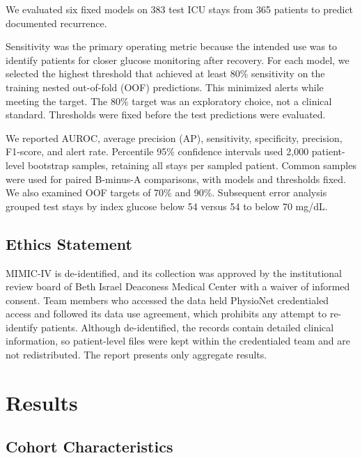\documentclass[twocolumn, 8pt]{article}
\begin{document}
We evaluated six fixed models on 383 test ICU stays from 365 patients to predict documented recurrence.

Sensitivity was the primary operating metric because the intended use was to identify patients for closer glucose monitoring after recovery. For each model, we selected the highest threshold that achieved at least 80\% sensitivity on the training nested out-of-fold (OOF) predictions. This minimized alerts while meeting the target. The 80\% target was an exploratory choice, not a clinical standard. Thresholds were fixed before the test predictions were evaluated.

We reported AUROC, average precision (AP), sensitivity, specificity, precision, F1-score, and alert rate. Percentile 95\% confidence intervals used 2,000 patient-level bootstrap samples, retaining all stays per sampled patient. Common samples were used for paired B-minus-A comparisons, with models and thresholds fixed. We also examined OOF targets of 70\% and 90\%. Subsequent error analysis grouped test stays by index glucose below 54 versus 54 to below 70 mg/dL.

\subsection*{Ethics Statement}

MIMIC-IV is de-identified, and its collection was approved by the institutional review board of Beth Israel Deaconess Medical Center with a waiver of informed consent.\cite{johnson2023mimiciv} Team members who accessed the data held PhysioNet credentialed access and followed its data use agreement, which prohibits any attempt to re-identify patients. Although de-identified, the records contain detailed clinical information, so patient-level files were kept within the credentialed team and are not redistributed. The report presents only aggregate results.


\section{Results}
\label{sec:results}

\subsection{Cohort Characteristics}
\label{sec:cohort}
\end{document}
